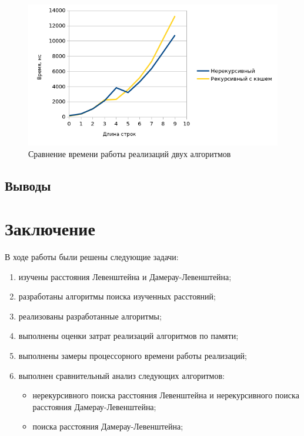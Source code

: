 \documentclass{report}
\begin{document}
\begin{figure}[ht]
    \centering
    \includegraphics[width=\textwidth]{plt-02.png}
    \caption{Сравнение времени работы реализаций двух алгоритмов}
\end{figure}

\section{Выводы}

\chapter*{Заключение}

В ходе работы были решены следующие задачи:

\begin{enumerate}
    \item изучены расстояния Левенштейна и Дамерау-Левенштейна;
    \item разработаны алгоритмы поиска изученных расстояний;
    \item реализованы разработанные алгоритмы;
    \item выполнены оценки затрат реализаций алгоритмов по памяти;
    \item выполнены замеры процессорного времени работы реализаций;
    \item выполнен сравнительный анализ следующих алгоритмов:
    \begin{itemize}
        \item нерекурсивного поиска расстояния Левенштейна и
            нерекурсивного поиска расстояния Дамерау-Левенштейна;
        \item поиска расстояния Дамерау-Левенштейна;
    \end{itemize}
\end{enumerate}
\end{document}
